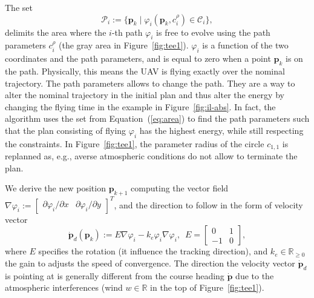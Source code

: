
The set
\begin{equation}\label{eq:area}
  \mathcal{P}_i:=\{\mathbf{p}_k\mid\varphi_i(\mathbf{p}_k,c_{i}^\rho)\in\mathcal{C}_i\},
\end{equation}
delimits the area where the $i$-th path $\varphi_i$ is free to evolve using the path parameters $c_i^\rho$ (the gray area in Figure~\ref{fig:tee1}). $\varphi_i$ is a function of the two coordinates and the path parameters, and is equal to zero when a point $\mathbf{p}_k$ is on the path. Physically, this means the UAV is flying exactly over the nominal trajectory. The path parameters allows to change the path. They are a way to alter the nominal trajectory in the initial plan and thus alter the energy by changing the flying time in the example in Figure~\ref{fig:il-abs}.
In fact, the algorithm uses the set from Equation~(\ref{eq:area}) to find the path parameters such that the plan consisting of flying $\varphi_i$ has the highest energy, while still respecting the constraints. In Figure~\ref{fig:tee1}, the parameter radius of the circle $c_{1,1}$ is replanned as, e.g., averse atmospheric conditions do not allow to terminate the plan.

We derive the new position $\mathbf{p}_{k+1}$ computing the vector field $\nabla\varphi_i:=\begin{bmatrix}\partial\varphi_i/\partial x & \partial\varphi_i/\partial y\end{bmatrix}^T$, and the direction to follow in the form of velocity vector~\cite{de2017guidance}
\begin{equation}\label{eq:pd}
  \dot{\mathbf{p}}_d(\mathbf{p}_k):=E\nabla\varphi_i-k_e\varphi_i\nabla\varphi_i,\,\,\,E=\begin{bmatrix}
    0&1\\-1&0
  \end{bmatrix},
\end{equation}
where $E$ specifies the rotation (it influence the tracking direction), and $k_e\in\mathbb{R}_{\geq 0}$ the gain to adjusts the speed of convergence. The direction the velocity vector $\dot{\mathbf{p}}_d$ is pointing at is generally different from the course heading $\dot{\mathbf{p}}$ due to the atmospheric interferences (wind $w\in\mathbb{R}$ in the top of Figure~\ref{fig:tee1}).

